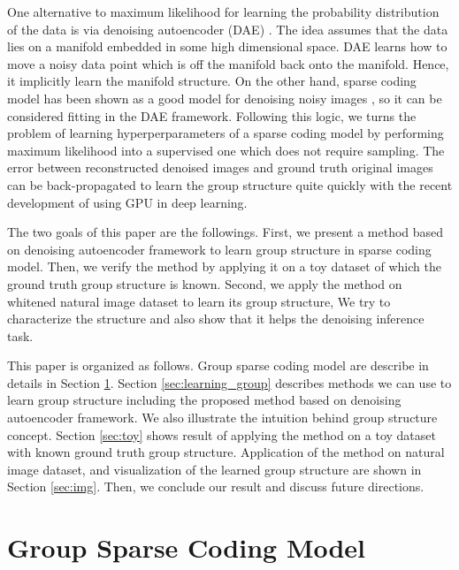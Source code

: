 
One alternative to maximum likelihood for learning the probability distribution of the data is via denoising autoencoder (DAE) \cite{by13}. The idea assumes that the data lies on a manifold embedded in some high dimensional space. DAE learns how to move a noisy data point which is off the manifold back onto the manifold. Hence, it implicitly learn the manifold structure. On the other hand, sparse coding model has been shown as a good model for denoising noisy images \cite{ha99, em06, ob13}, so it can be considered fitting in the DAE framework. Following this logic, we turns the problem of learning hyperperparameters of a sparse coding model by performing maximum likelihood into a supervised one which does not require sampling. The error between reconstructed denoised images and ground truth original images can be back-propagated to learn the group structure quite quickly with the recent development of using GPU in deep learning.

The two goals of this paper are the followings. First, we present a method based on denoising autoencoder framework to learn group structure in sparse coding model. Then, we verify the method by applying it on a toy dataset of which the ground truth group structure is known. Second, we apply the method on whitened natural image dataset to learn its group structure, We try to characterize the structure and also show that it helps the denoising inference task.

This paper is organized as follows. Group sparse coding model are describe in details in Section \ref{sec:model}. Section \ref{sec:learning_group}  describes methods we can use to learn group structure including the proposed method based on denoising autoencoder framework. We also illustrate the intuition behind group structure concept. Section \ref{sec:toy} shows result of applying the method on a toy dataset with known ground truth group structure. Application of the method on natural image dataset, and visualization of the learned group structure are shown in Section \ref{sec:img}. Then, we conclude our result and discuss future directions.

\section{Group Sparse Coding Model}
\label{sec:model}

